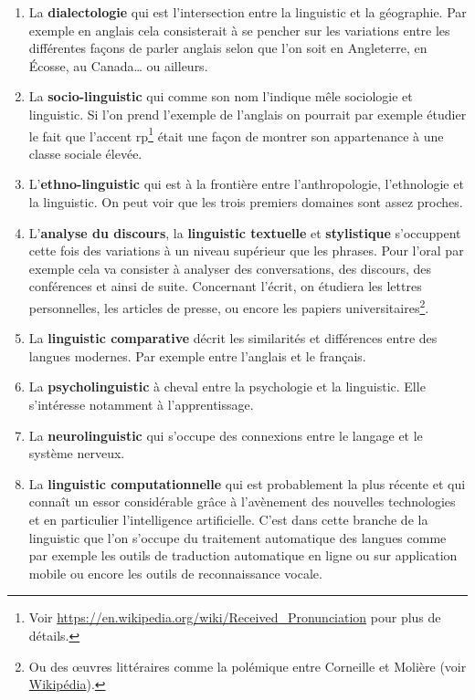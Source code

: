 \begin{enumerate}
\item La \textbf{dialectologie} qui est l'intersection entre la
  \gls{linguistic} et la géographie. Par exemple en anglais cela
  consisterait à se pencher sur les variations entre les différentes
  façons de parler anglais selon que l'on soit en Angleterre, en \'Ecosse, au
  Canada\dots{} ou ailleurs.
\item La \textbf{socio-\gls{linguistic}} qui comme son nom l'indique mêle
  sociologie et \gls{linguistic}. Si l'on prend l'exemple de l'anglais
  on pourrait par exemple étudier le fait que l'accent
  \acrfull{rp}\footnote{Voir
    \url{https://en.wikipedia.org/wiki/Received_Pronunciation} pour
    plus de détails.} était une
  façon de montrer son appartenance à une classe sociale élevée.
\item L'\textbf{ethno-\gls{linguistic}} qui est à la frontière entre
  l'anthropologie, l'ethnologie et la \gls{linguistic}. On peut voir que les
  trois premiers domaines sont assez proches.
\item L'\textbf{analyse du discours}, la \textbf{\gls{linguistic}
    textuelle} et \textbf{stylistique} s'occuppent cette fois des
  variations à un niveau supérieur que les phrases. Pour l'oral par
  exemple cela va consister à analyser des conversations, des
  discours, des conférences et ainsi de suite. Concernant l'écrit, on
  étudiera les lettres personnelles, les articles de presse, ou encore
  les papiers universitaires\footnote{Ou des {\oe}uvres littéraires
    comme la polémique entre Corneille et Molière (voir \href{https://fr.wikipedia.org/wiki/Paternit\%C3\%A9_des_\%C5\%93uvres_de_Moli\%C3\%A8re\#L'\%C3\%A9tude_statistique_de_Cyril_et_Dominique_Labb\%C3\%A9}{Wikipédia}).}.
\item La \textbf{\gls{linguistic} comparative} décrit les similarités et
  différences entre des langues modernes. Par exemple entre l'anglais
  et le français.
\item La \textbf{psycho\gls{linguistic}} à cheval entre la psychologie et
  la \gls{linguistic}. Elle s'intéresse notamment à l'apprentissage.
\item La \textbf{neuro\gls{linguistic}} qui s'occupe des connexions entre
  le langage et le système nerveux.
\item La \textbf{\gls{linguistic} computationnelle} qui est probablement
  la plus récente et qui connaît un essor considérable grâce à
  l'avènement des nouvelles technologies et en particulier
  l'intelligence artificielle. C'est dans cette branche de la
  \gls{linguistic} que l'on s'occupe du traitement automatique des langues
  comme par exemple les outils de traduction automatique en ligne ou
  sur application mobile ou encore les outils de reconnaissance
  vocale.   
\end{enumerate}

